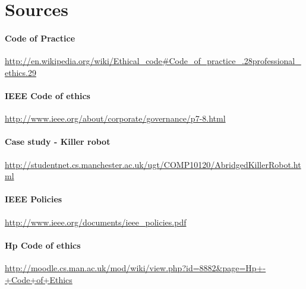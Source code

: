 \documentclass[a4paper]{article}
\begin{document}
\section{Sources}

\paragraph{Code of Practice}
\url{http://en.wikipedia.org/wiki/Ethical\_code\#Code\_of\_practice\_.28professional\_ethics.29}

\paragraph{IEEE Code of ethics}
\url{http://www.ieee.org/about/corporate/governance/p7-8.html}

\paragraph{Case study - Killer robot}
\url{http://studentnet.cs.manchester.ac.uk/ugt/COMP10120/AbridgedKillerRobot.html}

\paragraph{IEEE Policies}
\url{http://www.ieee.org/documents/ieee\_policies.pdf}

\paragraph{Hp Code of ethics}
\url{http://moodle.cs.man.ac.uk/mod/wiki/view.php?id=8882\&page=Hp+-+Code+of+Ethics}
\end{document}
